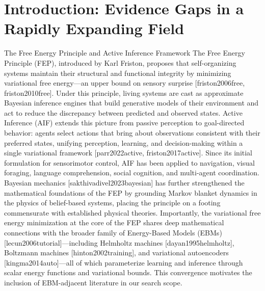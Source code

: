 \documentclass[
  ignorenonframetext,
]{beamer}
\author{\texorpdfstring{}{}}
\date{}
\providecommand{\citep}[1]{[#1]}
\begin{document}
\section{Introduction: Evidence Gaps in a Rapidly Expanding
Field}\label{introduction-evidence-gaps-in-a-rapidly-expanding-field}

\begin{frame}[allowframebreaks]{The Free Energy Principle and Active
Inference Framework}
\protect{}\label{the-free-energy-principle-and-active-inference-framework}
The Free Energy Principle (FEP), introduced by Karl Friston, proposes
that self-organizing systems maintain their structural and functional
integrity by minimizing variational free energy---an upper bound on
sensory surprise \citep{friston2006free, friston2010free}. Under this
principle, living systems are cast as approximate Bayesian inference
engines that build generative models of their environment and act to
reduce the discrepancy between predicted and observed states. Active
Inference (AIF) extends this picture from passive perception to
goal-directed behavior: agents select actions that bring about
observations consistent with their preferred states, unifying
perception, learning, and decision-making within a single variational
framework \citep{parr2022active, friston2017active}. Since its initial
formulation for sensorimotor control, AIF has been applied to
navigation, visual foraging, language comprehension, social cognition,
and multi-agent coordination. Bayesian mechanics
\citep{sakthivadivel2023bayesian} has further strengthened the
mathematical foundations of the FEP by grounding Markov blanket dynamics
in the physics of belief-based systems, placing the principle on a
footing commensurate with established physical theories. Importantly,
the variational free energy minimization at the core of the FEP shares
deep mathematical connections with the broader family of Energy-Based
Models (EBMs) \citep{lecun2006tutorial}---including Helmholtz machines
\citep{dayan1995helmholtz}, Boltzmann machines
\citep{hinton2002training}, and variational autoencoders
\citep{kingma2014auto}---all of which parameterize learning and
inference through scalar energy functions and variational bounds. This
convergence motivates the inclusion of EBM-adjacent literature in our
search scope.
\end{frame}
\end{document}
